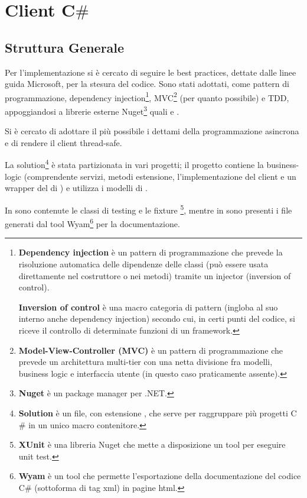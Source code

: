 
\chapter{Client C$\#$}
\section{Struttura Generale}

Per l'implementazione si è cercato di seguire le best practices, dettate dalle linee guida Microsoft, per la stesura del codice.
Sono stati adottati, come pattern di programmazione, dependency injection\footnote{
    \textbf{Dependency injection}\cite{dependency-injection} è un pattern di programmazione che prevede la risoluzione automatica delle dipendenze delle classi 
    (può essere usata direttamente nel costruttore o nei metodi) tramite un injector (inversion of control).

        \textbf{Inversion of control}\cite{inversion-of-control} è una macro categoria di pattern (ingloba al suo interno anche dependency injection)
        secondo cui, in certi punti del codice, si riceve il controllo di determinate funzioni di un framework.
}, MVC\footnote{
    \textbf{Model-View-Controller (MVC)}\cite{mvc} è un pattern di programmazione che prevede un architettura multi-tier con una netta divisione fra modelli, 
    business logic e interfaccia utente (in questo caso praticamente assente).
} (per quanto possibile) e TDD, appoggiandosi a librerie esterne Nuget\footnote{
    \textbf{Nuget}\cite{nuget} è un package manager per .NET.
} quali \cite{newtonsoft-json} e \cite{simple-injector}. 

Si è cercato di adottare il più possibile i dettami della programmazione asincrona e di rendere il client thread-safe.

La solution\footnote{
    \textbf{Solution} è un file, con estensione , che serve per raggruppare più progetti C$\#$ in un unico macro contenitore.  
} è stata partizionata in vari progetti; il progetto  contiene la business-logic 
(comprendente servizi, metodi estensione, l'implementazione del client e un wrapper del  di ) e utilizza i modelli di .

In  sono contenute le classi di testing e le fixture \footnote{
    \textbf{XUnit}\cite{xunit-repo} è una libreria Nuget\cite{xunit} che mette a disposizione un tool per eseguire unit test.     
}, mentre in  sono presenti i file generati dal tool Wyam\footnote{
    \textbf{Wyam}\cite{wyam} è un tool che permette l'esportazione della documentazione del codice C$\#$ 
    (sottoforma di tag xml\cite{code-doc}) in pagine html.
} per la documentazione.

